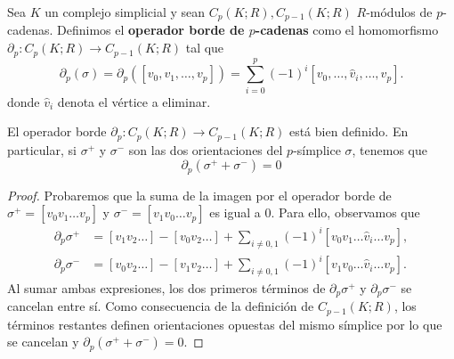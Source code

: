 \begin{definicion}
	Sea $K$ un complejo simplicial y sean $C_{p}(K;R), C_{p-1}(K;R)$ $R$-módulos de
	$p$-cadenas. Definimos el \textbf{operador borde de $p$-cadenas} como el homomorfismo
	$\partial_{p}: C_{p}(K;R) \to C_{p-1}(K;R)$ tal que
	\[
	\partial_{p}(\sigma) = \partial_{p}([v_{0}, v_{1}, \ldots, v_{p}]) = \sum_{i=0}
	^{p}(-1)^{i}[v_{0}, \ldots, \hat{v}_{i}, \ldots, v_{p}] .
	\]
	donde $\hat{v}_{i}$ denota el vértice a eliminar.
\end{definicion}
%
\begin{lema}
	El operador borde $\partial_{p}: C_{p}(K;R) \to C_{p-1}(K;R)$ está bien definido.
	En particular, si $\sigma^{+}$ y $\sigma^{-}$ son las dos orientaciones del $p$-símplice
	$\sigma$, tenemos que
	\[
	\partial_{p}(\sigma^{+}+\sigma^{-}) = 0
	\]
\end{lema}
\begin{proof}
	Probaremos que la suma de la imagen por el operador borde de $\sigma^{+}= [v_{0}
	v_{1}\ldots v_{p}]$ y $\sigma^{-}= [v_{1}v_{0}\ldots v_{p}]$ es igual a $0$.
	Para ello, observamos que
	\begin{align*}
		\partial_{p}\sigma^{+} & = [v_{1}v_{2}\ldots] - [v_{0}v_{2}\ldots] + \sum_{i\ne0,1}(-1)^{i}[v_{0}v_{1}\ldots \hat{v}_{i}\ldots v_{p}], \\
		\partial_{p}\sigma^{-} & = [v_{0}v_{2}\ldots] - [v_{1}v_{2}\ldots] + \sum_{i\ne0,1}(-1)^{i}[v_{1}v_{0}\ldots \hat{v}_{i}\ldots v_{p}].
	\end{align*}
	Al sumar ambas expresiones, los dos primeros términos de
	$\partial_{p}\sigma^{+}$ y $\partial_{p}\sigma^{-}$ se cancelan entre sí. Como
	consecuencia de la definición de $C_{p-1}(K;R)$, los términos restantes
	definen orientaciones opuestas del mismo símplice por lo que se cancelan y
	$\partial_{p}(\sigma^{+}+\sigma^{-})=0$.
\end{proof}


